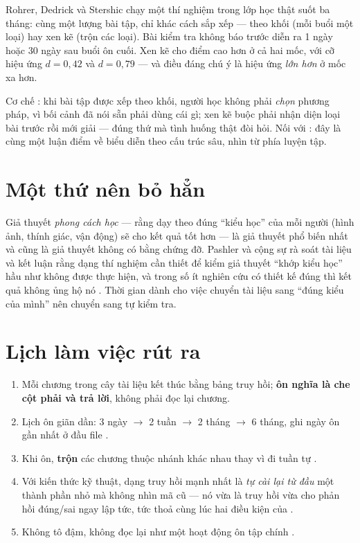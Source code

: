 \documentclass[../hieu-suat.tex]{subfiles}
\begin{document}
Rohrer, Dedrick và Stershic \cite{rohrer2015} chạy một thí nghiệm trong lớp học thật suốt ba tháng: cùng một lượng bài tập, chỉ khác cách sắp xếp --- theo khối (mỗi buổi một loại) hay xen kẽ (trộn các loại). Bài kiểm tra không báo trước diễn ra 1 ngày hoặc 30 ngày sau buổi ôn cuối. Xen kẽ cho điểm cao hơn ở cả hai mốc, với cỡ hiệu ứng \(d = 0{,}42\) và \(d = 0{,}79\) \nD{} --- và điều đáng chú ý là hiệu ứng \emph{lớn hơn} ở mốc xa hơn.

Cơ chế \nT{}: khi bài tập được xếp theo khối, người học không phải \emph{chọn} phương pháp, vì bối cảnh đã nói sẵn phải dùng cái gì; xen kẽ buộc phải nhận diện loại bài trước rồi mới giải --- đúng thứ mà tình huống thật đòi hỏi. Nối với : đây là cùng một luận điểm về biểu diễn theo cấu trúc sâu, nhìn từ phía luyện tập.

\section{Một thứ nên bỏ hẳn}

Giả thuyết \emph{phong cách học} --- rằng dạy theo đúng ``kiểu học'' của mỗi người (hình ảnh, thính giác, vận động) sẽ cho kết quả tốt hơn --- là giả thuyết phổ biến nhất và cũng là giả thuyết không có bằng chứng đỡ. Pashler và cộng sự \cite{pashler2008} rà soát tài liệu và kết luận rằng dạng thí nghiệm cần thiết để kiểm giả thuyết ``khớp kiểu học'' hầu như không được thực hiện, và trong số ít nghiên cứu có thiết kế đúng thì kết quả không ủng hộ nó \nD{}. Thời gian dành cho việc chuyển tài liệu sang ``đúng kiểu của mình'' nên chuyển sang tự kiểm tra.

\section{Lịch làm việc rút ra}

\begin{enumerate}
\item Mỗi chương trong cây tài liệu kết thúc bằng bảng truy hồi; \textbf{ôn nghĩa là che cột phải và trả lời}, không phải đọc lại chương.
\item Lịch ôn giãn dần: 3 ngày \(\rightarrow\) 2 tuần \(\rightarrow\) 2 tháng \(\rightarrow\) 6 tháng, ghi ngày ôn gần nhất ở đầu file \cite{cepeda2006}.
\item Khi ôn, \textbf{trộn} các chương thuộc nhánh khác nhau thay vì đi tuần tự \cite{rohrer2015}.
\item Với kiến thức kỹ thuật, dạng truy hồi mạnh nhất là \emph{tự cài lại từ đầu} một thành phần nhỏ mà không nhìn mã cũ \nM{} --- nó vừa là truy hồi vừa cho phản hồi đúng/sai ngay lập tức, tức thoả cùng lúc hai điều kiện của .
\item Không tô đậm, không đọc lại như một hoạt động ôn tập chính \cite{dunlosky2013}.
\end{enumerate}
\end{document}
